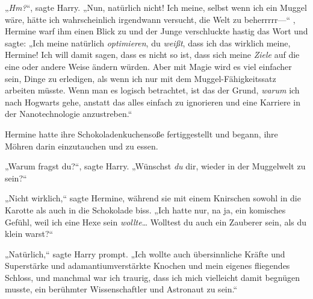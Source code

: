 „\emph{Hm?}“, sagte Harry. „Nun, natürlich nicht! Ich meine, selbst wenn ich ein Muggel wäre, hätte ich wahrscheinlich irgendwann versucht, die Welt zu beherrrrr—“ , Hermine warf ihm einen Blick zu und der Junge verschluckte hastig das Wort und sagte: „Ich meine natürlich \emph{optimieren}, du \emph{weißt}, dass ich das wirklich meine, Hermine! Ich will damit sagen, dass es nicht so ist, dass sich meine \emph{Ziele} auf die eine oder andere Weise ändern würden. Aber mit Magie wird es viel einfacher sein, Dinge zu erledigen, als wenn ich nur mit dem Muggel-Fähigkeitssatz arbeiten müsste. Wenn man es logisch betrachtet, ist das der Grund, \emph{warum} ich nach Hogwarts gehe, anstatt das alles einfach zu ignorieren und eine Karriere in der Nanotechnologie anzustreben.“

Hermine hatte ihre Schokoladenkuchensoße fertiggestellt und begann, ihre Möhren darin einzutauchen und zu essen.

„Warum fragst du?“, sagte Harry. „Wünschst \emph{du} dir, wieder in der Muggelwelt zu sein?“

„Nicht wirklich,“ sagte Hermine, während sie mit einem Knirschen sowohl in die Karotte als auch in die Schokolade biss. „Ich hatte nur, na ja, ein komisches Gefühl, weil ich eine Hexe sein \emph{wollte}… Wolltest du auch ein Zauberer sein, als du klein warst?“

„Natürlich,“ sagte Harry prompt. „Ich wollte auch übersinnliche Kräfte und Superstärke und adamantiumverstärkte Knochen und mein eigenes fliegendes Schloss, und manchmal war ich traurig, dass ich mich vielleicht damit begnügen musste, ein berühmter Wissenschaftler und Astronaut zu sein.“

